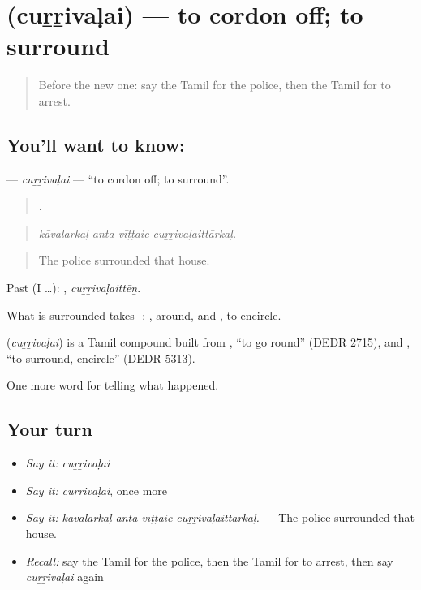 \section[\texorpdfstring{\ta{சுற்றிவளை} (cuṟṟivaḷai)}{சுற்றிவளை (cuṟṟivaḷai)}]{ (cuṟṟivaḷai) — to cordon off; to surround}

\label{lesson:TA-C296-currivalai}



\begin{quote}
Before the new one: say the Tamil for the police, then the Tamil for to arrest.
\end{quote}

\subsection*{You'll want to know: }
\textbf{} — \emph{cuṟṟivaḷai} — \textquotedblleft{}to cordon off; to surround\textquotedblright{}.

\begin{quote}
   .
\end{quote}

\begin{quote}
\emph{kāvalarkaḷ anta vīṭṭaic cuṟṟivaḷaittārkaḷ.}
\end{quote}

\begin{quote}
The police surrounded that house.
\end{quote}

Past (I …): , \emph{cuṟṟivaḷaittēṉ}.

What is surrounded takes -: , around, and , to encircle.

\begin{cousinweb}
\textbf{} (\emph{cuṟṟivaḷai}) is a Tamil compound built from , \textquotedblleft{}to go round\textquotedblright{} (DEDR 2715), and , \textquotedblleft{}to surround, encircle\textquotedblright{} (DEDR 5313).
\end{cousinweb}

\begin{grammarlens}[title={What you've built}]
One more word for telling what happened.
\end{grammarlens}

\subsection*{Your turn}
\begin{itemize}
\raggedright
  \item \emph{Say it:} \emph{cuṟṟivaḷai}
  \item \emph{Say it:} \emph{cuṟṟivaḷai}, once more
  \item \emph{Say it:} \emph{kāvalarkaḷ anta vīṭṭaic cuṟṟivaḷaittārkaḷ.} — The police surrounded that house.
  \item \emph{Recall:} say the Tamil for the police, then the Tamil for to arrest, then say \emph{cuṟṟivaḷai} again
\end{itemize}

